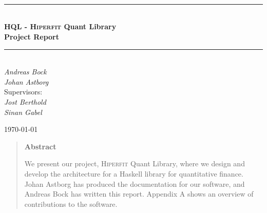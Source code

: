 \documentclass[a4paper,11pt]{scrreprt}
\def\Title{\bf HQL - \textsc{Hiperfit} Quant Library\\ {\Large Project Report}}
\newcommand{\HRule}{\rule{\linewidth}{0.5mm}}
\begin{document}
\begin{titlepage}

\textsc{\LARGE }\\[1.5cm]
\textsc{\Large }\\[0.5cm]
\textsc{\large }\\[0.5cm]
 
\begin{center}
\HRule \\[0.5cm]
\huge \bfseries \Title\\
\HRule \\[0.5cm]

\normalfont 
\Large
\textit{Andreas Bock \\ Johan Astborg }\\[1cm]
Supervisors:\\[0.5cm]
\textit{Jost Berthold\\ Sinan Gabel }\\[1cm]

\date{\today}

{\today}\\[4cm]
 
\vfill
\end{center}

\end{titlepage}
\begin{abstract}
\begin{center}
\textbf{Abstract}
\end{center}
We present our project, \textsc{Hiperfit} Quant Library, where we design and
develop the architecture for a Haskell library for quantitative finance.
Johan Astborg has produced the documentation for our software, and
Andreas Bock has written this report. Appendix A shows an overview of
contributions to the software.
\end{abstract}
\tableofcontents









\end{document}
